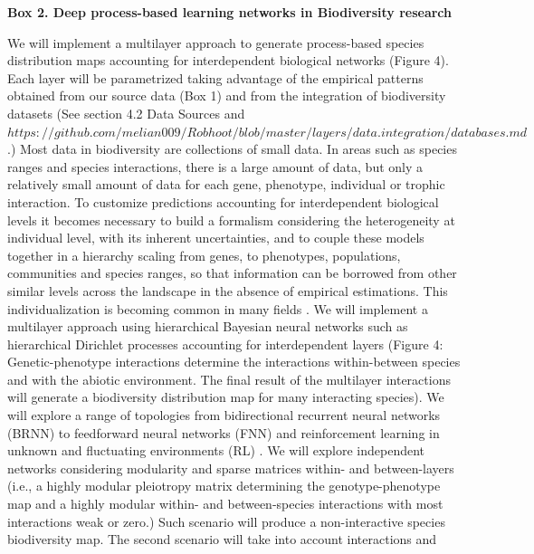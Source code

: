 \documentclass[11pt]{article}
\begin{document}
\begin{mybox}\begin{singlespace}
{\bf{Box 2. Deep process-based learning networks in Biodiversity research}}\\
\begin{small}
  We will implement a multilayer approach to generate process-based
  species distribution maps accounting for interdependent biological
  networks (Figure 4). Each layer will be parametrized taking
  advantage of the empirical patterns obtained from our source data
  (Box 1) and from the integration of biodiversity datasets (See
  section 4.2 Data Sources and
  $https://github.com/melian009/Robhoot/blob/master/layers/data.integration/databases.md$.)
  Most data in biodiversity are collections of small data. In areas
  such as species ranges and species interactions, there is a large
  amount of data, but only a relatively small amount of data for each
  gene, phenotype, individual or trophic interaction. To customize
  predictions accounting for interdependent biological levels it
  becomes necessary to build a formalism considering the heterogeneity
  at individual level, with its inherent uncertainties, and to couple
  these models together in a hierarchy scaling from genes, to
  phenotypes, populations, communities and species ranges, so that
  information can be borrowed from other similar levels across the
  landscape in the absence of empirical estimations. This
  individualization is becoming common in many fields
  \citep{Ghahramani:2015}. We will implement a multilayer approach
  using hierarchical Bayesian neural networks such as hierarchical
  Dirichlet processes accounting for interdependent layers (Figure 4:
  Genetic-phenotype interactions determine the interactions
  within-between species and with the abiotic environment. The final
  result of the multilayer interactions will generate a biodiversity
  distribution map for many interacting species). We will explore a
  range of topologies from bidirectional recurrent neural networks
  (BRNN) to feedforward neural networks (FNN) and reinforcement
  learning in unknown and fluctuating environments (RL)
  \citep{Schmidhuber:2015}. We will explore independent networks
  considering modularity and sparse matrices within- and
  between-layers (i.e., a highly modular pleiotropy matrix determining
  the genotype-phenotype map and a highly modular within- and
  between-species interactions with most interactions weak or zero.)
  Such scenario will produce a non-interactive species biodiversity
  map. The second scenario will take into account interactions and

\end{small}
\end{singlespace}
\end{mybox}
\end{document}
